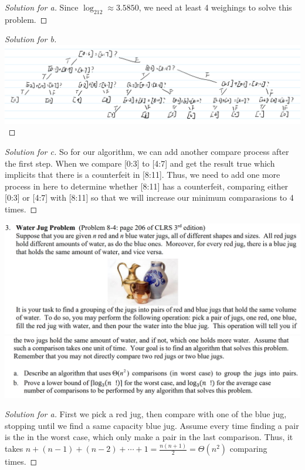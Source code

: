 \documentclass[12pt]{article}
\begin{document}
\begin{proof}[Solution for a]
	Since $\log_212\approx3.5850$, we need at least 4 weighings to solve this problem.
\end{proof}
\begin{proof}[Solution for b]
	\ \\
	\includegraphics[scale=0.22]{2_2.png}
\end{proof}
\begin{proof}[Solution for c]
	So for our algorithm, we can add another compare process after the first step. When we compare [0:3] to [4:7] and get the result true which implicits that there is a counterfeit in [8:11]. Thus, we need to add one more process in here to determine whether [8:11] has a counterfeit, comparing either [0:3] or [4:7] with [8:11] so that we will increase our minimum comparasions to 4 times.
\end{proof}
\includegraphics[scale=0.22]{3_1.png}
\includegraphics[scale=0.22]{3_2.png}
\begin{proof}[Solution for a]
	First we pick a red jug, then compare with one of the blue jug, stopping until we find a same capacity blue jug. Assume every time finding a pair is the in the worst case, which only make a pair in the last comparison. Thus, it takes $n+(n-1)+(n-2)+\cdots+1 = \frac{n(n+1)}{2} = \Theta(n^2)$ comparing times.
\end{proof}
\end{document}
